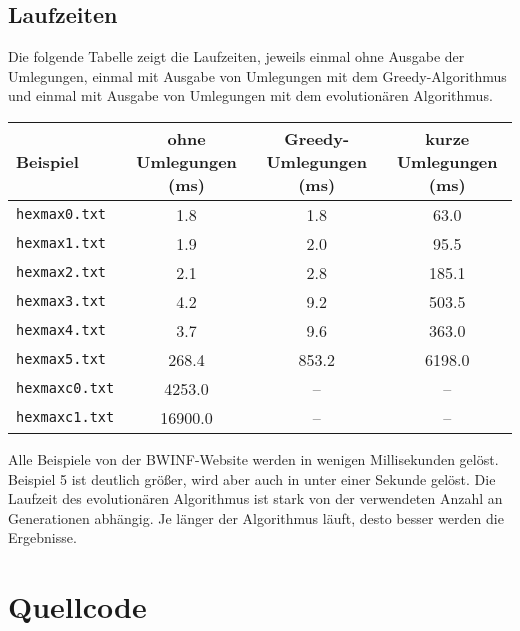 \documentclass[a4paper,10pt,ngerman]{scrartcl}
\begin{document}
\subsection*{Laufzeiten}
Die folgende Tabelle zeigt die Laufzeiten, jeweils einmal ohne Ausgabe der Umlegungen, einmal mit Ausgabe von Umlegungen mit dem Greedy-Algorithmus und einmal mit Ausgabe von Umlegungen mit dem evolutionären Algorithmus.
\begin{table}[H]
    \centering
    \begin{tabular}{lSSS}
        \toprule
        Beispiel & {ohne  Umlegungen (\si{\milli\second})} &  {Greedy-Umlegungen (\si{\milli\second})} & {kurze Umlegungen (\si{\milli\second})}\\ \midrule
        \texttt{hexmax0.txt} & 1.8   & 1.8   &   63.0 \\
        \texttt{hexmax1.txt} & 1.9   & 2.0   &   95.5 \\
        \texttt{hexmax2.txt} & 2.1   & 2.8   &  185.1 \\
        \texttt{hexmax3.txt} & 4.2   & 9.2   &  503.5 \\
        \texttt{hexmax4.txt} & 3.7   & 9.6   &  363.0 \\
        \texttt{hexmax5.txt} & 268.4 & 853.2 & 6198.0 \\
        \texttt{hexmaxc0.txt} & 4253.0 & {--} & {--} \\
        \texttt{hexmaxc1.txt} & 16900.0 & {--} & {--}  \\
        \bottomrule
    \end{tabular}
\end{table}
Alle Beispiele von der BWINF-Website werden in wenigen Millisekunden gelöst. Beispiel 5 ist deutlich größer, wird aber auch in unter einer Sekunde gelöst. 
Die Laufzeit des evolutionären Algorithmus ist stark von der verwendeten Anzahl an Generationen abhängig. Je länger der Algorithmus läuft, desto besser werden die Ergebnisse.
\section{Quellcode}







\end{document}
